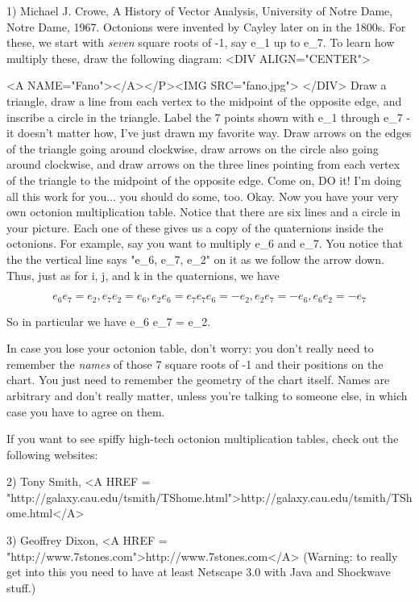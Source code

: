 1) Michael J. Crowe, A History of Vector Analysis, University of Notre
Dame, Notre Dame, 1967.
Octonions were invented by Cayley later on in the 1800s.  For these,
we start with \emph{seven} square roots of -1, say e_{1} up to e_{7}.  To learn
how multiply these, draw the following diagram:
<DIV ALIGN="CENTER">

<A NAME="Fano"></A></P><IMG SRC="fano.jpg">
</DIV>
Draw a triangle, draw a line from each vertex to the midpoint of the 
opposite edge, and inscribe a circle in the triangle.  Label the
7 points shown with e_{1} through e_{7} - it doesn't matter how, I've just
drawn my favorite way.  Draw arrows on the edges of the triangle
going around clockwise, draw arrows on the circle also going around
clockwise, and draw arrows on the three lines pointing from each vertex
of the triangle to the midpoint of the opposite edge.  Come on, DO it!
I'm doing all this work for you... you should do some, too.
Okay.  Now you have your very own octonion multiplication table.  Notice
that there are six lines and a circle in your picture.  Each one of
these gives us a copy of the quaternions inside the octonions.   For
example, say you want to multiply e_{6} and e_{7}.  You notice that the
the vertical line says "e_{6}, e_{7}, e_{2}" on it as we follow the arrow down.
Thus, just as for i, j, and k in the quaternions, we have

$$

e_{6} e_{7} =  e_{2},   e_{7} e_{2} =  e_{6},   e_{2} e_{6} =  e_{7}
e_{7} e_{6} = -e_{2},   e_{2} e_{7} = -e_{6},   e_{6} e_{2} = -e_{7}
$$
    
So in particular we have e_{6} e_{7} = e_{2}.

In case you lose your octonion table, don't worry: you don't really need
to remember the \emph{names} of those 7 square roots of -1 and their
positions on the chart.  You just need to remember the geometry of the
chart itself.  Names are arbitrary and don't really matter, unless
you're talking to someone else, in which case you have to agree on them.

If you want to see spiffy high-tech octonion multiplication tables,
check out the following websites:

2) Tony Smith, <A HREF = "http://galaxy.cau.edu/tsmith/TShome.html">http://galaxy.cau.edu/tsmith/TShome.html</A>

3) Geoffrey Dixon, <A HREF = "http://www.7stones.com">http://www.7stones.com</A>
(Warning: to really get into
this you need to have at least Netscape 3.0 with Java and Shockwave
stuff.)  


